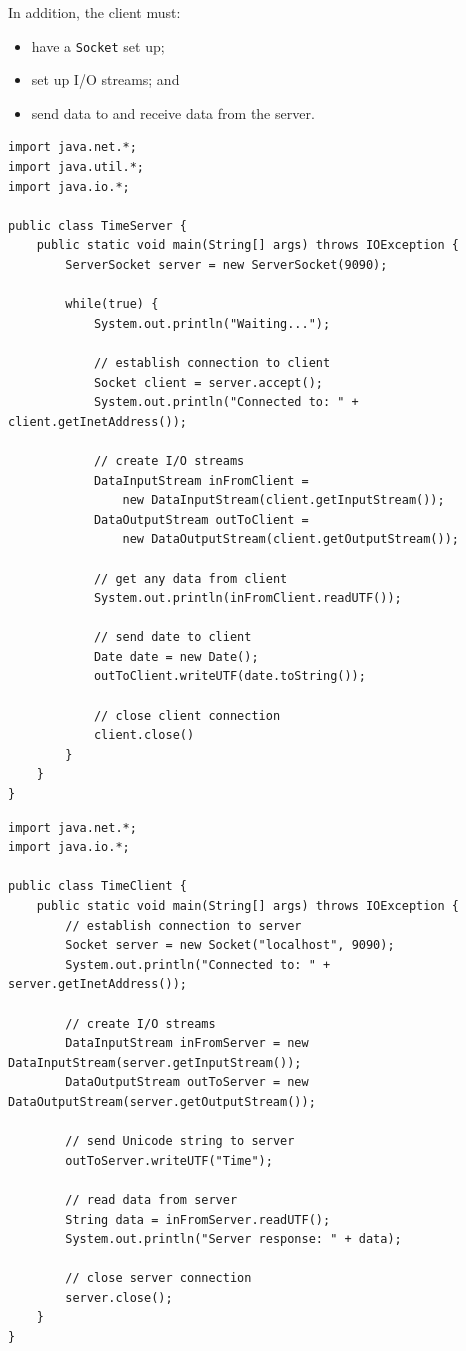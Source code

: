\documentclass[a4paper]{systems-software}
\begin{document}
In addition, the client must:
\begin{itemize}
	\item have a \texttt{Socket} set up;
	\item set up I/O streams; and
	\item send data to and receive data from the server.
\end{itemize}

\newpage

\begin{lstlisting}[title={TimeServer class.}]
import java.net.*;
import java.util.*;
import java.io.*;

public class TimeServer {
	public static void main(String[] args) throws IOException {
		ServerSocket server = new ServerSocket(9090);
		
		while(true) {
			System.out.println("Waiting...");
			
			// establish connection to client
			Socket client = server.accept();
			System.out.println("Connected to: " + client.getInetAddress());
			
			// create I/O streams
			DataInputStream inFromClient =
				new DataInputStream(client.getInputStream());
			DataOutputStream outToClient =
				new DataOutputStream(client.getOutputStream());
			
			// get any data from client
			System.out.println(inFromClient.readUTF());
			
			// send date to client
			Date date = new Date();
			outToClient.writeUTF(date.toString());
			
			// close client connection
			client.close()
		}
	}
}
\end{lstlisting}

\begin{lstlisting}[title={TimeClient class.}]
import java.net.*;
import java.io.*;

public class TimeClient {
	public static void main(String[] args) throws IOException {
		// establish connection to server
		Socket server = new Socket("localhost", 9090);
		System.out.println("Connected to: " + server.getInetAddress());
		
		// create I/O streams
		DataInputStream inFromServer = new DataInputStream(server.getInputStream());
		DataOutputStream outToServer = new DataOutputStream(server.getOutputStream());
		
		// send Unicode string to server
		outToServer.writeUTF("Time");
		
		// read data from server
		String data = inFromServer.readUTF();
		System.out.println("Server response: " + data);
		
		// close server connection
		server.close();
	}
}

\end{lstlisting}
\end{document}
